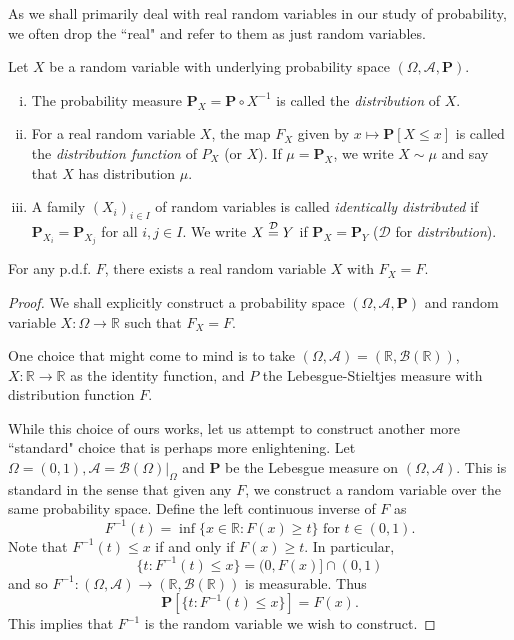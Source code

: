 As we shall primarily deal with real random variables in our study of probability, we often drop the ``real" and refer to them as just random variables.

\begin{definition}
    Let $X$ be a random variable with underlying probability space $(\Omega,\mathcal{A},\textbf{P})$.
    \begin{enumerate}[(i)]
        \item The probability measure $\textbf{P}_X=\textbf{P}\circ X^{-1}$ is called the \textit{distribution} of $X$.
        \item For a real random variable $X$, the map $F_X$ given by $x\mapsto\textbf{P}[X\leq x]$ is called the \textit{distribution function} of $P_X$ (or $X$). If $\mu=\textbf{P}_X$, we write $X\sim\mu$ and say that $X$ has distribution $\mu$.
        \item A family $(X_i)_{i\in I}$ of random variables is called \textit{identically distributed} if $\textbf{P}_{X_i}=\textbf{P}_{X_j}$ for all $i,j\in I$. We write $X\stackrel{\mathcal{D}}{=} Y$ if $\textbf{P}_X=\textbf{P}_Y$ ($\mathcal{D}$ for \textit{distribution}).
    \end{enumerate}
\end{definition}

\begin{theorem}
    For any p.d.f. $F$, there exists a real random variable $X$ with $F_X=F$.
\end{theorem}

\begin{proof}
    We shall explicitly construct a probability space $(\Omega,\mathcal{A},\textbf{P})$ and random variable $X:\Omega\to\mathbb{R}$ such that $F_X=F$.
    
    \vspace{1mm}
    One choice that might come to mind is to take $(\Omega,\mathcal{A}) = (\mathbb{R},\mathcal{B}(\mathbb{R}))$, $X:\mathbb{R}\to\mathbb{R}$ as the identity function, and \textbf{$P$} the Lebesgue-Stieltjes measure with distribution function $F$.
    
    \vspace{1.5mm}
    While this choice of ours works, let us attempt to construct another more ``standard" choice that is perhaps more enlightening. Let $\Omega=(0,1),\mathcal{A}=\left.\mathcal{B}(\Omega)\right|_\Omega$ and $\textbf{P}$ be the Lebesgue measure on $(\Omega,\mathcal{A})$. This is standard in the sense that given any $F$, we construct a random variable over the same probability space. Define the left continuous inverse of $F$ as
    $$F^{-1}(t)=\inf\{x\in\mathbb{R}:F(x)\geq t\}\text{ for }t\in (0,1).$$
    Note that $F^{-1}(t)\leq x$ if and only if $F(x)\geq t$.
    In particular,
    $$\{t:F^{-1}(t)\leq x\}=(0,F(x)]\cap(0,1)$$
    and so $F^{-1}:(\Omega,\mathcal{A})\to(\mathbb{R},\mathcal{B}(\mathbb{R}))$ is measurable. Thus
    $$\textbf{P}\left[\{t:F^{-1}(t)\leq x\}\right]=F(x).$$
    This implies that $F^{-1}$ is the random variable we wish to construct.
\end{proof}

